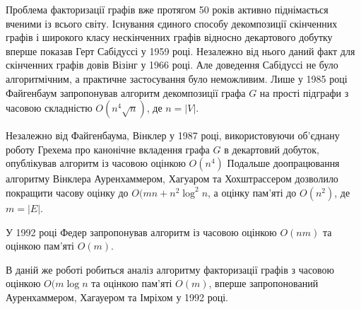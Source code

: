 Проблема факторизації графів вже протягом 50 років активно піднімається вченими із всього світу.
Існування єдиного способу декомпозиції скінченних графів і широкого класу нескінченних графів відносно декартового добутку вперше показав Герт Сабідуссі у 1959 році\cite{sabidussi59}.
Незалежно від нього даний факт для скінченних графів довів Візінг у 1966 році.
Але доведення Сабідуссі не було алгоритмічним, а практичне застосування було неможливим.
Лише у 1985 році Файгенбаум запропонував алгоритм декомпозиції графа $G$ на прості підграфи з часовою складністю $O(n^4\sqrt n)$, де $n=\vert V \vert$.

Незалежно від Файгенбаума, Вінклер у 1987 році, використовуючи об'єднану роботу Грехема про канонічне вкладення графа $G$ в декартовий добуток, опублікував алгоритм із часовою оцінкою $O(n^4)$
Подальше доопрацювання алгоритму Вінклера Ауренхаммером, Хагуаром та Хохштрассером дозволило покращити часову оцінку до $O(mn+n^2\log^2n$, а оцінку пам'яті до $O(n^2)$, де $m=\vert E \vert$.

У 1992 році Федер запропонував алгоритм із часовою оцінкою $O(nm)$ та оцінкою пам'яті $O(m)$.

В даній же роботі робиться аналіз алгоритму факторизації графів з часовою оцінкою $O(m\log n$ та оцінкою пам'яті $O(m)$, вперше запропонований Ауренхаммером, Хагауером та Імріхом у 1992 році\cite{aurenhammer92}.
